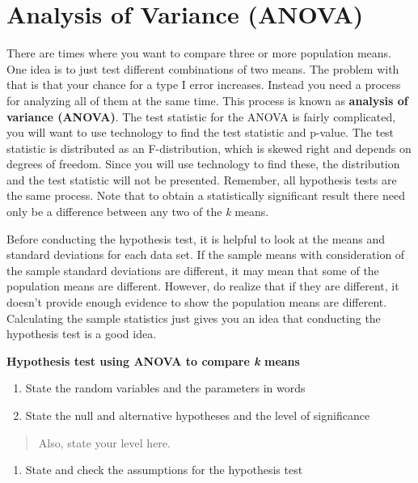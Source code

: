 \documentclass[]{book}
\providecommand{\tightlist}{%
  \setlength{\itemsep}{0pt}\setlength{\parskip}{0pt}}
\begin{document}
\hypertarget{analysis-of-variance-anova}{%
\section{Analysis of Variance (ANOVA)}\label{analysis-of-variance-anova}}

There are times where you want to compare three or more population means. One idea is to just test different combinations of two means. The problem with that is that your chance for a type I error increases. Instead you need a process for analyzing all of them at the same time. This process is known as \textbf{analysis of variance (ANOVA)}. The test statistic for the ANOVA is fairly complicated, you will want to use technology to find the test statistic and p-value. The test statistic is distributed as an F-distribution, which is skewed right and depends on degrees of freedom. Since you will use technology to find these, the distribution and the test statistic will not be presented. Remember, all hypothesis tests are the same process. Note that to obtain a statistically significant result there need only be a difference between any two of the \emph{k} means.

Before conducting the hypothesis test, it is helpful to look at the means and standard deviations for each data set. If the sample means with consideration of the sample standard deviations are different, it may mean that some of the population means are different. However, do realize that if they are different, it doesn't provide enough evidence to show the population means are different. Calculating the sample statistics just gives you an idea that conducting the hypothesis test is a good idea.

\textbf{Hypothesis test using ANOVA to compare \emph{k} means}

\begin{enumerate}
\def\labelenumi{\arabic{enumi}.}
\item
  State the random variables and the parameters in words
\item
  State the null and alternative hypotheses and the level of significance
\end{enumerate}

\begin{quote}
Also, state your level here.
\end{quote}

\begin{enumerate}
\def\labelenumi{\arabic{enumi}.}
\setcounter{enumi}{2}
\tightlist
\item
  State and check the assumptions for the hypothesis test
\end{enumerate}
\end{document}
